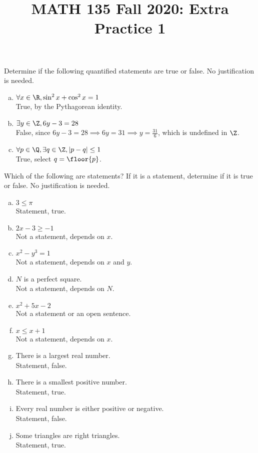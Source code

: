 \documentclass{agony}
\title{MATH 135 Fall 2020: Extra Practice 1}
\begin{document}
\thispagestyle{firstpage}

\textbf{\thetitle}


\question Determine if the following quantified statements are true or false.
No justification is needed.
\begin{enumerate}[(a)]
  \item $\forall x\in\R, \sin^2x+\cos^2x=1$ \\
        True, by the Pythagorean identity.
  \item $\exists y\in\Z, 6y-3=28$ \\
        False, since $6y-3=28 \implies 6y=31 \implies y=\frac{31}{6}$, which is undefined in $\Z$.
  \item $\forall p\in\Q, \exists q\in\Z, |p-q| \leq 1$ \\
        True, select $q = \floor{p}$.
\end{enumerate}



\question Which of the following are statements?
If it is a statement, determine if it is true or false.
No justification is needed.
\begin{enumerate}[(a)]
  \item $3 \leq \pi$ \\
        Statement, true.
  \item $2x-3 \geq -1$ \\
        Not a statement, depends on $x$.
  \item $x^2-y^3 = 1$ \\
        Not a statement, depends on $x$ and $y$.
  \item $N$ is a perfect square. \\
        Not a statement, depends on $N$.
  \item $x^2+5x-2$ \\
        Not a statement or an open sentence.
  \item $x \leq x+1$ \\
        Not a statement, depends on $x$.
  \item There is a largest real number. \\
        Statement, false.
  \item There is a smallest positive number. \\
        Statement, true.
  \item Every real number is either positive or negative. \\
        Statement, false.
  \item Some triangles are right triangles. \\
        Statement, true.
\end{enumerate}
\end{document}
